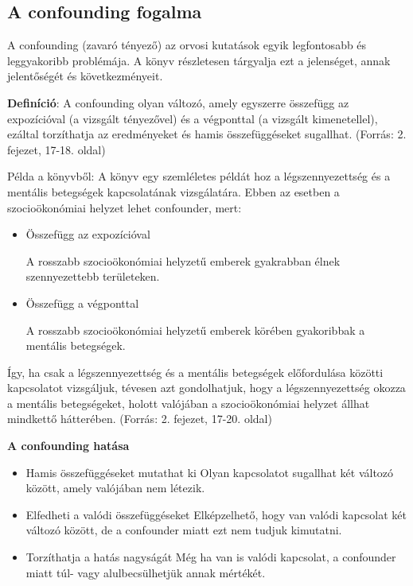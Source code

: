 \documentclass[a4paper,12pt]{article}
\begin{document}
    \subsection{A confounding fogalma}

    A confounding (zavaró tényező) az orvosi kutatások egyik legfontosabb és leggyakoribb problémája. A könyv részletesen tárgyalja ezt a jelenséget, annak jelentőségét és következményeit.

    \textbf{Definíció}: A confounding olyan változó, amely egyszerre összefügg az expozícióval (a vizsgált tényezővel) és a végponttal (a vizsgált kimenetellel), ezáltal torzíthatja az eredményeket és hamis összefüggéseket sugallhat. (Forrás: 2. fejezet, 17-18. oldal)

    Példa a könyvből: A könyv egy szemléletes példát hoz a légszennyezettség és a mentális betegségek kapcsolatának vizsgálatára. Ebben az esetben a szocioökonómiai helyzet lehet confounder, mert:

    \begin{itemize}

        \item Összefügg az expozícióval

        A rosszabb szocioökonómiai helyzetű emberek gyakrabban élnek szennyezettebb területeken.

        \item Összefügg a végponttal

        A rosszabb szocioökonómiai helyzetű emberek körében gyakoribbak a mentális betegségek.

    \end{itemize}

    Így, ha csak a légszennyezettség és a mentális betegségek előfordulása közötti kapcsolatot vizsgáljuk, tévesen azt gondolhatjuk, hogy a légszennyezettség okozza a mentális betegségeket, holott valójában a szocioökonómiai helyzet állhat mindkettő hátterében. (Forrás: 2. fejezet, 17-20. oldal)

    \textbf{A confounding hatása}

    \begin{itemize}

        \item Hamis összefüggéseket mutathat ki
        Olyan kapcsolatot sugallhat két változó között, amely valójában nem létezik.


        \item Elfedheti a valódi összefüggéseket
        Elképzelhető, hogy van valódi kapcsolat két változó között, de a confounder miatt ezt nem tudjuk kimutatni.


        \item Torzíthatja a hatás nagyságát
        Még ha van is valódi kapcsolat, a confounder miatt túl- vagy alulbecsülhetjük annak mértékét.
    \end{itemize}
\end{document}
